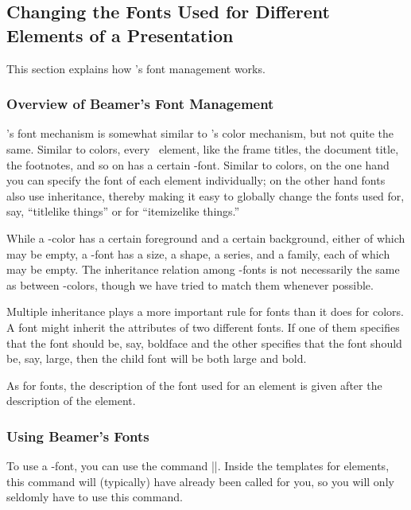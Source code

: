\subsection{Changing the Fonts Used for Different Elements of a Presentation}

This section explains how \beamer's font management works.

\subsubsection{Overview of Beamer's Font Management}

\beamer's font mechanism is somewhat similar to \beamer's color mechanism, but not quite the same. Similar to colors, every \beamer\ element, like the frame titles, the document title, the footnotes, and so on has a certain \beamer-font. Similar to colors, on the one hand you can specify the font of each element individually; on the other hand fonts also use inheritance, thereby making it easy to globally change the fonts used for, say, ``titlelike things'' or for ``itemizelike things.''

While a \beamer-color has a certain foreground and a certain background, either of which may be empty, a \beamer-font has a size, a shape, a series, and a family, each of which may be empty. The inheritance relation among \beamer-fonts is not necessarily the same as between \beamer-colors, though we have tried to match them whenever possible.

Multiple inheritance plays a more important rule for fonts than it does for colors. A font might inherit the attributes of two different fonts. If one of them specifies that the font should be, say, boldface and the other specifies that the font should be, say, large, then the child font will be both large and bold.

As for fonts, the description of the font used for an element is given after the description of the element.


\subsubsection{Using Beamer's Fonts}

To use a \beamer-font, you can use the command |\usebeamerfont|. Inside the templates for elements, this command will (typically) have already been called for you, so you will only seldomly have to use this command.

